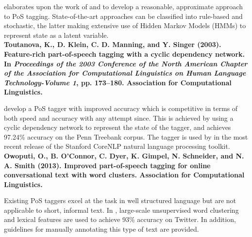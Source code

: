 {\noindent \cite{abney1997part} elaborates upon the work of \cite{church1988stochastic} and \cite{derose1988grammatical} to develop a reasonable, approximate approach to PoS tagging. State-of-the-art approaches can be classified into rule-based and stochastic, the latter making extensive use of Hidden Markov Models (HMMs) to represent state as a latent variable.\\

\noindent \textbf{Toutanova, K., D. Klein, C. D. Manning, and Y. Singer (2003). Feature-rich part-of-speech tagging with a cyclic dependency network. In \textit{Proceedings of the 2003 Conference of the North American Chapter of the Association for Computational Linguistics on Human Language Technology-Volume 1}, pp. 173–180. Association for Computational Linguistics.}

\noindent \cite{toutanova2003feature} develop a PoS tagger with improved accuracy which is competitive in terms of both speed and accuracy with any attempt since.
This is achieved by using a cyclic dependency network to represent the state of the tagger, and achieves 97.24\% accuracy on the Penn Treebank corpus.
The tagger is used by \cite{manning2014stanford} in the most recent release of the Stanford CoreNLP natural language processing toolkit.\\


\noindent \textbf{Owoputi, O., B. O’Connor, C. Dyer, K. Gimpel, N. Schneider, and N. A. Smith (2013). Improved part-of-speech tagging for online conversational text with word clusters. Association for Computational Linguistics.}

\noindent Existing PoS taggers excel at the task in well structured language but are not applicable to short, informal text. In \cite{owoputi2013improved}, large-scale unsupervised word clustering and lexical features are used to achieve 93\% accuracy on Twitter.
In addition, guidelines for manually annotating this type of text are provided.\\

}
